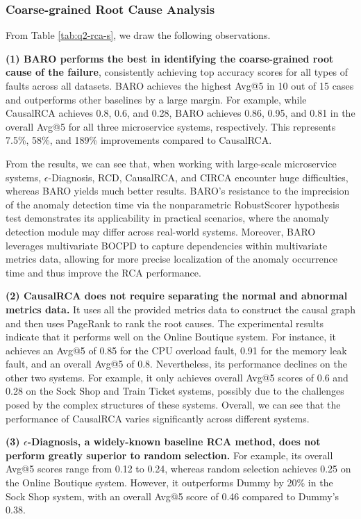 \subsubsection{Coarse-grained Root Cause Analysis}

From Table \ref{tab:q2-rca-s}, we draw the following observations.

\textbf{(1) BARO performs the best in identifying the coarse-grained root cause of the failure}, consistently achieving top accuracy scores for all types of faults across all datasets. BARO achieves the highest Avg@5 in 10 out of 15 cases and outperforms other baselines by a large margin. For example, while CausalRCA achieves 0.8, 0.6, and 0.28, BARO achieves 0.86, 0.95, and 0.81 in the overall Avg@5 for all three microservice systems, respectively. This represents 7.5\%, 58\%, and 189\% improvements compared to CausalRCA.



From the results, we can see that, when working with large-scale microservice systems, $\epsilon$-Diagnosis, RCD, CausalRCA, and CIRCA encounter huge difficulties, whereas BARO yields much better results. BARO's resistance to the imprecision of the anomaly detection time via the nonparametric RobustScorer hypothesis test demonstrates its applicability in practical scenarios, where the anomaly detection module may differ across real-world systems. Moreover, BARO leverages multivariate BOCPD to capture dependencies within multivariate metrics data, allowing for more precise localization of the anomaly occurrence time and thus improve the RCA performance. 


\textbf{(2) CausalRCA does not require separating the normal and abnormal metrics data.} It uses all the provided metrics data to construct the causal graph and then uses PageRank to rank the root causes. The experimental results indicate that it performs well on the Online Boutique system. For instance, it achieves an Avg@5 of 0.85 for the CPU overload fault, 0.91 for the memory leak fault, and an overall Avg@5 of 0.8. Nevertheless, its performance declines on the other two systems. For example, it only achieves overall Avg@5 scores of 0.6 and 0.28 on the Sock Shop and Train Ticket systems, possibly due to the challenges posed by the complex structures of these systems. Overall, we can see that the performance of CausalRCA varies significantly across different systems.

\textbf{(3) $\epsilon$-Diagnosis, a widely-known baseline RCA method, does not perform greatly superior to random selection.} For example, its overall Avg@5 scores range from 0.12 to 0.24, whereas random selection achieves 0.25 on the Online Boutique system. However, it outperforms Dummy by 20\% in the Sock Shop system, with an overall Avg@5 score of 0.46 compared to Dummy's 0.38.

